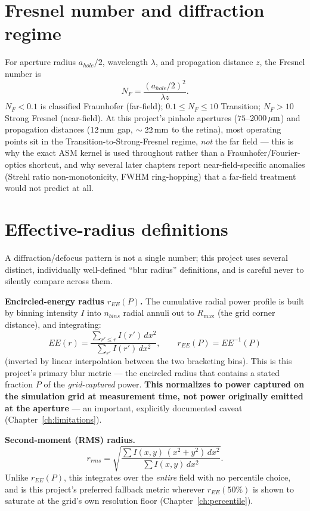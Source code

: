 \section{Fresnel number and diffraction regime}

For aperture radius $a_{hole}/2$, wavelength $\lambda$, and propagation distance $z$,
the Fresnel number is
\begin{equation}
N_F = \frac{(a_{hole}/2)^2}{\lambda z}.
\end{equation}
$N_F<0.1$ is classified Fraunhofer (far-field); $0.1\le N_F\le10$ Transition; $N_F>10$
Strong Fresnel (near-field). At this project's pinhole apertures ($75$--$2000\,\mu\text{m}$) and
propagation distances ($12\,\text{mm}$ gap, $\sim22\,\text{mm}$ to the retina), most operating points
sit in the Transition-to-Strong-Fresnel regime, \emph{not} the far field --- this is
why the exact ASM kernel is used throughout rather than a Fraunhofer/Fourier-optics
shortcut, and why several later chapters report near-field-specific anomalies (Strehl
ratio non-monotonicity, FWHM ring-hopping) that a far-field treatment would not predict
at all.

\section{Effective-radius definitions}
\label{sec:effective-radius}

A diffraction/defocus pattern is not a single number; this project uses several
distinct, individually well-defined ``blur radius'' definitions, and is careful never
to silently compare across them.

\textbf{Encircled-energy radius $r_{EE}(P)$.} The cumulative radial power profile is
built by binning intensity $I$ into $n_{bins}$ radial annuli out to $R_{\max}$ (the
grid corner distance), and integrating:
\begin{equation}
EE(r) = \frac{\sum_{r' \le r} I(r')\,dx^2}{\sum_{r'} I(r')\,dx^2}, \qquad
r_{EE}(P) = EE^{-1}(P)
\end{equation}
(inverted by linear interpolation between the two bracketing bins). This is this
project's primary blur metric --- the encircled radius that contains a stated fraction
$P$ of the \emph{grid-captured} power. \textbf{This normalizes to power captured on the
simulation grid at measurement time, not power originally emitted at the aperture} ---
an important, explicitly documented caveat (Chapter~\ref{ch:limitations}).

\textbf{Second-moment (RMS) radius.}
\begin{equation}
r_{rms} = \sqrt{\frac{\sum I(x,y)\,(x^2+y^2)\,dx^2}{\sum I(x,y)\,dx^2}}.
\end{equation}
Unlike $r_{EE}(P)$, this integrates over the \emph{entire} field with no percentile
choice, and is this project's preferred fallback metric wherever $r_{EE}(50\%)$ is
shown to saturate at the grid's own resolution floor (Chapter~\ref{ch:percentile}).

